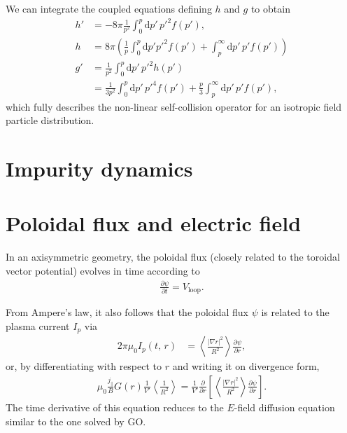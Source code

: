 \documentclass[11pt,a4paper]{article}
\newcommand{\rd}{\ensuremath{\mathrm{d}}}
\newcommand{\sub}[1]{\ensuremath{_{\text{#1}}}}
\begin{document}
We can integrate the coupled equations defining $h$ and $g$ to obtain
\begin{align}
h' &= -8\pi \frac{1}{p^2}\int_0^p \rd p' \, p'^2 f(p'), \nonumber \\
h &= 8\pi \left( \frac{1}{p}\int_0^p \rd p' p'^2 f(p') + \int_p^\infty \rd p' \, p'f(p')\right) \nonumber \\
g' &= \frac{1}{p^2} \int_0^p \rd p'\,p'^2 h(p') \nonumber \\
&= \frac{1}{3p^2}\int_0^p \rd p' \, p'^4 f(p') + \frac{p}{3}\int_p^\infty \rd p'\,p'f(p'),
\end{align}
which fully describes the non-linear self-collision operator for an isotropic field particle distribution.



\section{Impurity dynamics}



\section{Poloidal flux and electric field}
In an axisymmetric geometry, the poloidal flux (closely related to the toroidal vector potential) evolves in time according to
\begin{align}
\frac{\partial \psi}{\partial t} = V\sub{loop}.
\end{align}

From Ampere's law, it also follows that the poloidal flux $\psi$ is related to the plasma current $I_p$ via
\begin{align}
2\pi \mu_0 I_p(t,\,r) &= \left\langle \frac{|\nabla r|^2}{R^2}\right\rangle \frac{\partial \psi}{\partial r},
\end{align}
or, by differentiating with respect to $r$ and writing it on divergence form,
\begin{align}
\mu_0 \frac{j_\parallel}{B} G(r)\frac{1}{V'}\left\langle \frac{1}{R^2}\right\rangle = \frac{1}{V'}\frac{\partial }{\partial r}\left[\left\langle \frac{|\nabla r|^2}{R^2}\right\rangle \frac{\partial \psi}{\partial r}\right].
\end{align}
The time derivative of this equation reduces to the $E$-field diffusion equation similar to the one solved by GO.
\end{document}
